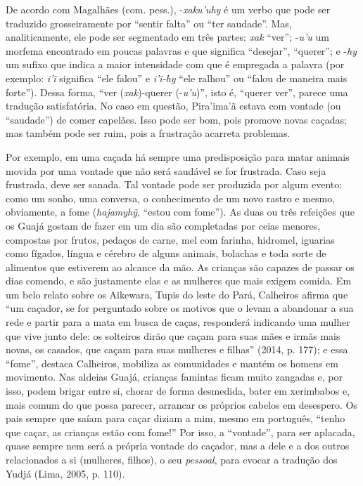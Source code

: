 De acordo com Magalhães (com. pess.), -\emph{xaku'uhy} é um verbo que
pode ser traduzido grosseiramente por ``sentir falta'' ou ``ter saudade''.
Mas, analiticamente, ele pode ser segmentado em três partes: \emph{xak}
``ver''; -\emph{u'u} um morfema encontrado em poucas palavras e que
significa ``desejar'', ``querer''; e -\emph{hy} um sufixo que indica a maior
intensidade com que é empregada a palavra (por exemplo: \emph{i'ĩ}
significa ``ele falou'' e \emph{i'ĩ-hy} ``ele ralhou'' ou ``falou de maneira
mais forte''). Dessa forma, ``ver (\emph{xak})-querer (-\emph{u'u})'', isto
é, ``querer ver'', parece uma tradução satisfatória. No caso em questão,
Pira'ima'ã estava com vontade (ou ``saudade'') de comer capelães. Isso
pode ser bom, pois promove novas caçadas; mas também pode ser ruim, pois
a frustração acarreta problemas.

Por exemplo, em uma caçada há sempre uma predisposição para matar
animais movida por uma vontade que não será saudável se for frustrada.
Caso seja frustrada, deve ser sanada. Tal vontade pode ser produzida por
algum evento: como um sonho, uma conversa, o conhecimento de um novo
rastro e mesmo, obviamente, a fome (\emph{hajamyhỹ}, ``estou com
fome''). As duas ou três refeições que os Guajá gostam de fazer em um
dia são completadas por ceias menores, compostas por frutos, pedaços de
carne, mel com farinha, hidromel, iguarias como fígados, língua e
cérebro de alguns animais, bolachas e toda sorte de alimentos que
estiverem ao alcance da mão. As crianças são capazes de passar os dias
comendo, e são justamente elas e as mulheres que mais exigem comida. Em
um belo relato sobre os Aikewara, Tupis do leste do Pará, Calheiros
afirma que ``um caçador, se for perguntado sobre os motivos que o levam
a abandonar a sua rede e partir para a mata em busca de caças,
responderá indicando uma mulher que vive junto dele: os solteiros dirão
que caçam para suas mães e irmãs mais novas, os casados, que caçam para
suas mulheres e filhas'' (2014, p. 177); e essa ``fome'', destaca
Calheiros, mobiliza as comunidades e mantém os homens em movimento. Nas
aldeias Guajá, crianças famintas ficam muito zangadas e, por isso, podem
brigar entre si, chorar de forma desmedida, bater em xerimbabos e, mais
comum do que possa parecer, arrancar os próprios cabelos em desespero.
Os pais sempre que saíam para caçar diziam a mim, mesmo em português,
``tenho que caçar, as crianças estão com fome!'' Por isso, a
``vontade'', para ser aplacada, quase sempre nem será a própria vontade
do caçador, mas a dele e a dos outros relacionados a si (mulheres,
filhos), o seu \emph{pessoal}, para evocar a tradução dos Yudjá (Lima,
2005, p. 110).

